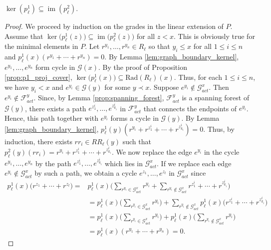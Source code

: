 \documentclass[english,a4paper,nolineno,cleveref]{socg-lipics-v2021}
\DeclareMathOperator{\im}{im}
\begin{document}
\begin{proposition} \label{prop:exact_at2_2}
     $\ker(p_\ell^1) \subseteq \im(p_\ell^2)$.
\end{proposition}

\begin{proof}
We proceed by induction on the grades in the linear extension of $P$. Assume that $\ker\!\big(p_\ell^1(z)\big)\subseteq \im\!\big(p_\ell^2(z)\big)$ for all $z<x$. This is obviously true for the minimal elements in $P$.
Let $r^{y_1},\ldots,r^{y_n}\in R_\ell$ so that $y_i\leq x$ for all $1\leq i\leq n$ and $p^1_\ell(x)(r^{y_1}+\cdots+r^{y_n})=0$. By Lemma \ref{lem:graph_boundary_kernel}, $e^{y_1},\ldots,e^{y_n}$ form cycle in $\mathcal{G}(x)$. By the proof of Proposition \ref{prop:p1_proj_cover}, $\ker\!\big(p_\ell^1(x)\big)\subseteq \mathrm{Rad}(R_\ell)(x)$. Thus, for each $1\leq i\leq n$, we have $y_i<x$ and $e^{y_i}\in \mathcal{G}(y)$ for some $y\prec x$.  Suppose $e^{y_i}\notin \mathcal{G}_{act}^x$. Then $e^{y_i}\notin \mathcal{F}_{act}^y$. Since, by Lemma \ref{prop:spanning_forest}, $\mathcal{F}_{act}^y$ is a spanning forest of $\mathcal{G}(y)$, there exists a path $e^{z^i_1},\ldots,e^{z^i_{k_i}}$ in $\mathcal{F}_{act}^y$ that connects the endpoints of $e^{y_i}$. Hence, this path together with $e^{y_i}$ forms a cycle in $\mathcal{G}(y)$. By Lemma \ref{lem:graph_boundary_kernel}, $p_\ell^1(y)(r^{y_i}+r^{z^i_1}+\cdots+r^{z^i_{k_i}})=0$. Thus, by induction, there exists $rr_i\in RR_\ell(y)$ such that $p^2_\ell(y)(rr_i)=r^{y_i}+r^{z^i_1}+\cdots+r^{z^i_{k_i}}$. We now replace the edge $e^{y_i}$ in the cycle $e^{y_1},\ldots,e^{y_n}$ by the path $e^{z^i_1},\ldots,e^{z^i_{k_i}}$ which lies in $\mathcal{G}_{act}^{x}$. If we replace each edge $e^{y_i}\notin \mathcal{G}_{act}^x$ by such a path, we obtain a cycle $e^{z_1},\ldots,e^{z_l}$ in $\mathcal{G}_{act}^x$ since 
\begin{equation*}
\begin{aligned}
p_\ell^1(x)\big(r^{z_1}+\cdots+r^{z_l}\big)=&p_\ell^1(x)\big(\sum_{r^{y_i}\in\mathcal{G}_{act}^x}r^{y_i}+\sum_{r^{y_i}\notin \mathcal{G}_{act}^x}r^{z^i_1}+\cdots+r^{z^i_{k_i}}\big)\\&=p_\ell^1(x)\big(\sum_{r^{y_i}\in\mathcal{G}_{act}^x}r^{y_i}\big)+\sum_{r^{y_i}\notin \mathcal{G}_{act}^x}p_\ell^1(x)\big(r^{z^i_1}+\cdots+r^{z^i_{k_i}}\big)\\&=p_\ell^1(x)\big(\sum_{r^{y_i}\in\mathcal{G}_{act}^x}r^{y_i}\big)+p_\ell^1(x)\big(\sum_{r^{y_i}\notin\mathcal{G}_{act}^x}r^{y_i}\big)\\&=p_\ell^1(x)(r^{y_1}+\cdots+r^{y_n})=0 .

\end{aligned}
\end{equation*}
\end{proof}
\end{document}
